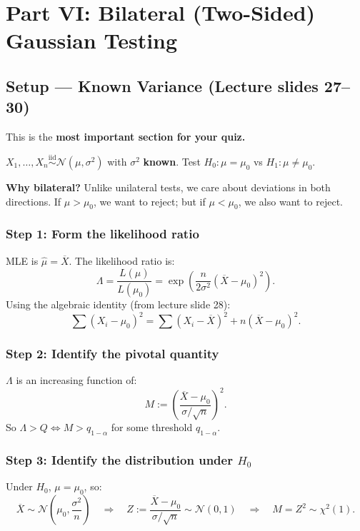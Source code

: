 \documentclass[11pt,a4paper]{article}
\newcommand{\iid}{\overset{\text{iid}}{\sim}}
\begin{document}
\section{Part VI: Bilateral (Two-Sided) Gaussian Testing}

\subsection{Setup --- Known Variance (Lecture slides 27--30)}

This is the \textbf{most important section for your quiz.}

$X_1,\ldots,X_n \iid \mathcal{N}(\mu,\sigma^2)$ with $\sigma^2$ \textbf{known}. Test $H_0:\mu=\mu_0$ vs $H_1:\mu\neq\mu_0$.

\textbf{Why bilateral?} Unlike unilateral tests, we care about deviations in both directions. If $\mu>\mu_0$, we want to reject; but if $\mu<\mu_0$, we also want to reject.

\subsubsection{Step 1: Form the likelihood ratio}

MLE is $\hat\mu=\overline{X}$. The likelihood ratio is:
\[
  \Lambda = \frac{L(\hat\mu)}{L(\mu_0)} = \exp\!\left(\frac{n}{2\sigma^2}(\overline{X}-\mu_0)^2\right).
\]
Using the algebraic identity (from lecture slide 28):
\[
  \sum(X_i-\mu_0)^2 = \sum(X_i-\overline{X})^2 + n(\overline{X}-\mu_0)^2.
\]

\subsubsection{Step 2: Identify the pivotal quantity}

$\Lambda$ is an increasing function of:
\[
  M := \left(\frac{\overline{X}-\mu_0}{\sigma/\sqrt{n}}\right)^2.
\]
So $\Lambda>Q \iff M>q_{1-\alpha}$ for some threshold $q_{1-\alpha}$.

\subsubsection{Step 3: Identify the distribution under $H_0$}

Under $H_0$, $\mu=\mu_0$, so:
\[
  \overline{X} \sim \mathcal{N}\!\left(\mu_0,\frac{\sigma^2}{n}\right)
  \quad\Rightarrow\quad
  Z := \frac{\overline{X}-\mu_0}{\sigma/\sqrt{n}} \sim \mathcal{N}(0,1)
  \quad\Rightarrow\quad
  M = Z^2 \sim \chi^2(1).
\]
\end{document}
